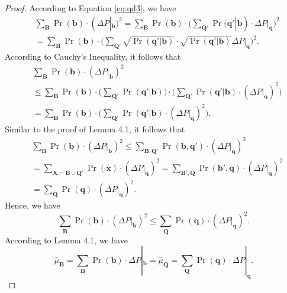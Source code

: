\documentclass[twoside,leqno,twocolumn]{article}
\begin{document}
\begin{proof}
According to Equation \eqref{eq:qd3}, we have
\begin{equation*}
\begin{split}
& \sum_{\mathbf{B}}\Pr(\mathbf{b})\cdot (\Delta P|_{\mathbf{b}})^{2} = \sum_{\mathbf{B}}\Pr(\mathbf{b})\cdot \Big(\sum_{\mathbf{Q'}}\Pr(\mathbf{q'}|\mathbf{b})\cdot \Delta P|_{\mathbf{q}}\Big)^{2} \\
& = \sum_{\mathbf{B}}\Pr(\mathbf{b})\cdot \Big(\sum_{\mathbf{Q'}}\sqrt{\Pr(\mathbf{q'}|\mathbf{b})}\cdot \sqrt{\Pr(\mathbf{q'}|\mathbf{b})} \Delta P|_{\mathbf{q}}\Big)^{2}.
\end{split}
\end{equation*}
According to Cauchy's Inequality, it follows that
\begin{equation*}
\begin{split}
& \sum_{\mathbf{B}}\Pr(\mathbf{b})\cdot (\Delta P|_{\mathbf{b}})^{2} \\
& \leq \sum_{\mathbf{B}}\Pr(\mathbf{b})\cdot \Big(\sum_{\mathbf{Q'}}\Pr(\mathbf{q'}|\mathbf{b})\Big) \cdot \Big(\sum_{\mathbf{Q'}}\Pr(\mathbf{q'}|\mathbf{b})\cdot (\Delta P|_{\mathbf{q}})^{2}\Big) \\
& = \sum_{\mathbf{B}}\Pr(\mathbf{b})\cdot \Big(\sum_{\mathbf{Q'}}\Pr(\mathbf{q'}|\mathbf{b})\cdot (\Delta P|_{\mathbf{q}})^{2}\Big).
\end{split}
\end{equation*}
Similar to the proof of Lemma 4.1, it follows that
\begin{equation*}
\begin{split}
& \sum_{\mathbf{B}}\Pr(\mathbf{b})\cdot (\Delta P|_{\mathbf{b}})^{2} \leq \sum_{\mathbf{B},\mathbf{Q'}}\Pr(\mathbf{b},\mathbf{q'})\cdot (\Delta P|_{\mathbf{q}})^{2} \\
& = \sum_{\mathbf{X}=\mathbf{B\cup Q'}}\Pr(\mathbf{x})\cdot (\Delta P|_{\mathbf{q}})^{2} = \sum_{\mathbf{B'},\mathbf{Q}}\Pr(\mathbf{b'},\mathbf{q})\cdot (\Delta P|_{\mathbf{q}})^{2} \\
& = \sum_{\mathbf{Q}}\Pr(\mathbf{q})\cdot (\Delta P|_{\mathbf{q}})^{2}.
\end{split}
\end{equation*}
Hence,  we have
\begin{equation*}
\sum_{\mathbf{B}}\Pr(\mathbf{b})\cdot (\Delta P|_{\mathbf{b}})^{2} \leq \sum_{\mathbf{Q}}\Pr(\mathbf{q})\cdot (\Delta P|_{\mathbf{q}})^{2}.
\end{equation*}
According to Lemma 4.1, we have
\begin{equation*}
\hat{\mu}_{\mathbf{B}}=\sum_{\mathbf{B}}\Pr(\mathbf{b})\cdot \Delta P|_{\mathbf{b}}=\hat{\mu}_{\mathbf{Q}}=\sum_{\mathbf{Q}}\Pr(\mathbf{q})\cdot \Delta P|_{\mathbf{q}}.

\end{equation*}
\end{proof}
\end{document}
